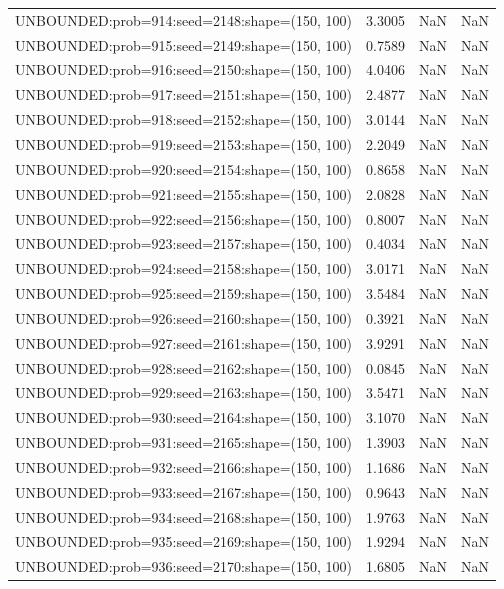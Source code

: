 \begin{longtable}{lccc}
UNBOUNDED:prob=914:seed=2148:shape=(150, 100) &  3.3005 &   NaN &    NaN \\
UNBOUNDED:prob=915:seed=2149:shape=(150, 100) &  0.7589 &   NaN &    NaN \\
UNBOUNDED:prob=916:seed=2150:shape=(150, 100) &  4.0406 &   NaN &    NaN \\
UNBOUNDED:prob=917:seed=2151:shape=(150, 100) &  2.4877 &   NaN &    NaN \\
UNBOUNDED:prob=918:seed=2152:shape=(150, 100) &  3.0144 &   NaN &    NaN \\
UNBOUNDED:prob=919:seed=2153:shape=(150, 100) &  2.2049 &   NaN &    NaN \\
UNBOUNDED:prob=920:seed=2154:shape=(150, 100) &  0.8658 &   NaN &    NaN \\
UNBOUNDED:prob=921:seed=2155:shape=(150, 100) &  2.0828 &   NaN &    NaN \\
UNBOUNDED:prob=922:seed=2156:shape=(150, 100) &  0.8007 &   NaN &    NaN \\
UNBOUNDED:prob=923:seed=2157:shape=(150, 100) &  0.4034 &   NaN &    NaN \\
UNBOUNDED:prob=924:seed=2158:shape=(150, 100) &  3.0171 &   NaN &    NaN \\
UNBOUNDED:prob=925:seed=2159:shape=(150, 100) &  3.5484 &   NaN &    NaN \\
UNBOUNDED:prob=926:seed=2160:shape=(150, 100) &  0.3921 &   NaN &    NaN \\
UNBOUNDED:prob=927:seed=2161:shape=(150, 100) &  3.9291 &   NaN &    NaN \\
UNBOUNDED:prob=928:seed=2162:shape=(150, 100) &  0.0845 &   NaN &    NaN \\
UNBOUNDED:prob=929:seed=2163:shape=(150, 100) &  3.5471 &   NaN &    NaN \\
UNBOUNDED:prob=930:seed=2164:shape=(150, 100) &  3.1070 &   NaN &    NaN \\
UNBOUNDED:prob=931:seed=2165:shape=(150, 100) &  1.3903 &   NaN &    NaN \\
UNBOUNDED:prob=932:seed=2166:shape=(150, 100) &  1.1686 &   NaN &    NaN \\
UNBOUNDED:prob=933:seed=2167:shape=(150, 100) &  0.9643 &   NaN &    NaN \\
UNBOUNDED:prob=934:seed=2168:shape=(150, 100) &  1.9763 &   NaN &    NaN \\
UNBOUNDED:prob=935:seed=2169:shape=(150, 100) &  1.9294 &   NaN &    NaN \\
UNBOUNDED:prob=936:seed=2170:shape=(150, 100) &  1.6805 &   NaN &    NaN \\

\end{longtable}
